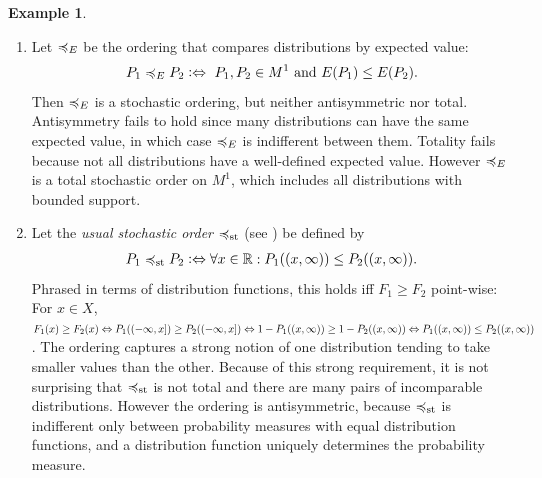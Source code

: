 \documentclass[a4paper,DIV=11]{scrreprt}
\newcommand{\M}{M}
\theoremstyle{definition}
\newtheorem{ex}[thm]{Example} %
\begin{document}
    \begin{ex}~
        \label{ex:stochasticOrdersLeqELeqst}
        \begin{enumerate}
            \item 
            Let $\preccurlyeq_E$ be the ordering that compares distributions by expected value:
            \begin{gather*}
                P_1 \leqE P_2 \colonlra \text{ $P_1, P_2 \in \M^1$ and $E(P_1) \leq E(P_2)$}.
            \end{gather*}
            Then $\preccurlyeq_E$ is a stochastic ordering, but neither antisymmetric nor total. Antisymmetry fails to hold since many distributions can have the same expected value, in which case $\preccurlyeq_E$ is indifferent between them. Totality fails because not all distributions have a well-defined expected value. However $\preccurlyeq_E$ is a total stochastic order on $\M^1$, which includes all distributions with bounded support.
            
            \item Let the \emph{usual stochastic order} $\preccurlyeq_{\text{st}}$ (see \cite{bib:shakedStochasticOrders}) be defined by 
            \begin{gather*}
                P_1 \preccurlyeq_{\text{st}} P_2 \mathrel{\vcentcolon\Leftrightarrow} \forall x \in \mathbb{R}: P_1((x, \infty)) \leq P_2((x, \infty)).
            \end{gather*}
            Phrased in terms of distribution functions, this holds iff $F_1 \geq F_2$ point-wise: For $x \in X$, $F_1(x) \geq F_2(x) \Leftrightarrow P_1((-\infty, x]) \geq P_2((-\infty, x]) \Leftrightarrow 1 - P_1((x, \infty)) \geq 1 - P_2((x, \infty)) \Leftrightarrow P_1((x, \infty)) \leq P_2((x, \infty))$. The ordering captures a strong notion of one distribution tending to take smaller values than the other. Because of this strong requirement, it is not surprising that $\preccurlyeq_{\text{st}}$ is not total and there are many pairs of incomparable distributions. However the ordering is antisymmetric, because $\preccurlyeq_{\text{st}}$ is indifferent only between probability measures with equal distribution functions, and a distribution function uniquely determines the probability measure.
        \end{enumerate}
    \end{ex}

    \let\dpref\dgeq
    \let\dnonpref\dleq
    \let\dstrpref\dgreater
    \let\dstrnonpref\dless
    
\end{document}
